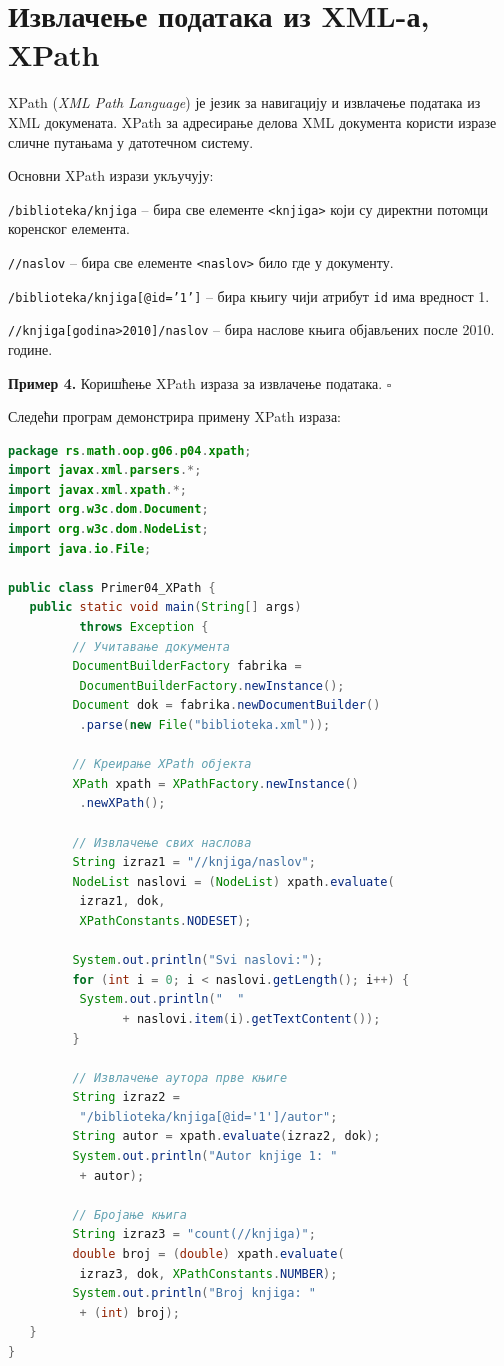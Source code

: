 \section{Извлачење података из XML-а, XPath}

XPath (\textit{XML Path Language}) је језик за навигацију и извлачење података из XML докумената. XPath за адресирање делова XML документа користи изразе сличне путањама у датотечном систему.

Основни XPath изрази укључују:

\texttt{/biblioteka/knjiga} – бира све елементе \texttt{\textless{}knjiga\textgreater{}} који су директни потомци коренског елемента.

\texttt{//naslov} – бира све елементе \texttt{\textless{}naslov\textgreater{}} било где у документу.

\texttt{/biblioteka/knjiga[@id='1']} – бира књигу чији атрибут \texttt{id} има вредност 1.

\texttt{//knjiga[godina\textgreater{}2010]/naslov} – бира наслове књига објављених после 2010. године.


\bigskip

\noindent \textbf{Пример 4.} Коришћење XPath израза за извлачење података. $\square$

\medskip

Следећи програм демонстрира примену XPath израза:


\begin{lstlisting}[language=Java]
package rs.math.oop.g06.p04.xpath;
import javax.xml.parsers.*;
import javax.xml.xpath.*;
import org.w3c.dom.Document;
import org.w3c.dom.NodeList;
import java.io.File;
 
public class Primer04_XPath {
   public static void main(String[] args)
          throws Exception {
         // Учитавање документа
         DocumentBuilderFactory fabrika =
          DocumentBuilderFactory.newInstance();
         Document dok = fabrika.newDocumentBuilder()
          .parse(new File("biblioteka.xml"));
 
         // Креирање XPath објекта
         XPath xpath = XPathFactory.newInstance()
          .newXPath();
 
         // Извлачење свих наслова
         String izraz1 = "//knjiga/naslov";
         NodeList naslovi = (NodeList) xpath.evaluate(
          izraz1, dok,
          XPathConstants.NODESET);
 
         System.out.println("Svi naslovi:");
         for (int i = 0; i < naslovi.getLength(); i++) {
          System.out.println("  "
                + naslovi.item(i).getTextContent());
         }
 
         // Извлачење аутора прве књиге
         String izraz2 =
          "/biblioteka/knjiga[@id='1']/autor";
         String autor = xpath.evaluate(izraz2, dok);
         System.out.println("Autor knjige 1: "
          + autor);
 
         // Бројање књига
         String izraz3 = "count(//knjiga)";
         double broj = (double) xpath.evaluate(
          izraz3, dok, XPathConstants.NUMBER);
         System.out.println("Broj knjiga: "
          + (int) broj);
   }
}
\end{lstlisting}


